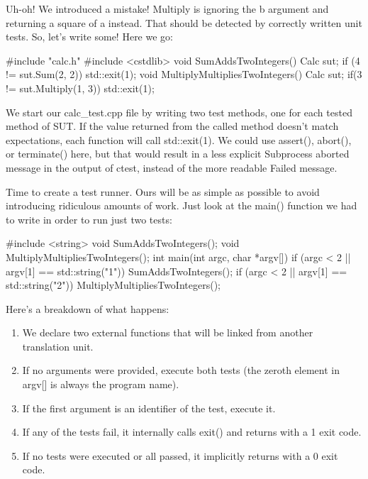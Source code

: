 Uh-oh! We introduced a mistake! Multiply is ignoring the b argument and returning a square of a instead. That should be detected by correctly written unit tests. So, let’s write some! Here we go:


\begin{cpp}
#include "calc.h"
#include <cstdlib>
void SumAddsTwoIntegers() {
    Calc sut;
    if (4 != sut.Sum(2, 2))
        std::exit(1);
}
void MultiplyMultipliesTwoIntegers() {
    Calc sut;
    if(3 != sut.Multiply(1, 3))
    std::exit(1);
}
\end{cpp}

We start our calc\_test.cpp file by writing two test methods, one for each tested method of SUT. If the value returned from the called method doesn’t match expectations, each function will call std::exit(1). We could use assert(), abort(), or terminate() here, but that would result in a less explicit Subprocess aborted message in the output of ctest, instead of the more readable Failed message.

Time to create a test runner. Ours will be as simple as possible to avoid introducing ridiculous amounts of work. Just look at the main() function we had to write in order to run just two tests:


\begin{cpp}
#include <string>
void SumAddsTwoIntegers();
void MultiplyMultipliesTwoIntegers();
int main(int argc, char *argv[]) {
    if (argc < 2 || argv[1] == std::string("1"))
        SumAddsTwoIntegers();
    if (argc < 2 || argv[1] == std::string("2"))
        MultiplyMultipliesTwoIntegers();
}
\end{cpp}

Here’s a breakdown of what happens:

\begin{enumerate}
\item
We declare two external functions that will be linked from another translation unit.

\item
If no arguments were provided, execute both tests (the zeroth element in argv[] is always the program name).

\item
If the first argument is an identifier of the test, execute it.

\item
If any of the tests fail, it internally calls exit() and returns with a 1 exit code.

\item
If no tests were executed or all passed, it implicitly returns with a 0 exit code.
\end{enumerate}


